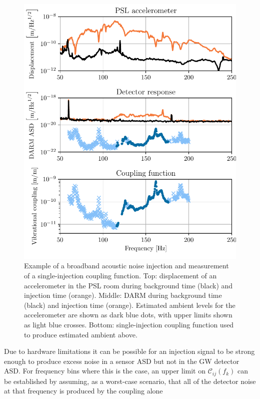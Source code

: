 \begin{figure}
	\centering
	\includegraphics[width=\textwidth]{figures/injection-example.pdf}
	\caption{
		Example of a broadband acoustic noise injection and measurement of a single-injection coupling function.
		Top: displacement of an accelerometer in the PSL room during background time (black) and injection time (orange).
		Middle: DARM during background time (black) and injection time (orange).
		Estimated ambient levels for the accelerometer are shown as dark blue dots, with upper limits shown as light blue crosses.
		Bottom: single-injection coupling function used to produce estimated ambient above.}
	\label{fig:injection}
\end{figure}

Due to hardware limitations it can be possible for an injection signal to be strong enough to produce excess noise in a sensor \ac{ASD} but not in the \ac{GW} detector \ac{ASD}.
For frequency bins where this is the case, an upper limit on $\mathcal{C}_{ij}(f_k)$ can be established by assuming, as a worst-case scenario, that all of the detector noise at that frequency is produced by the coupling alone

